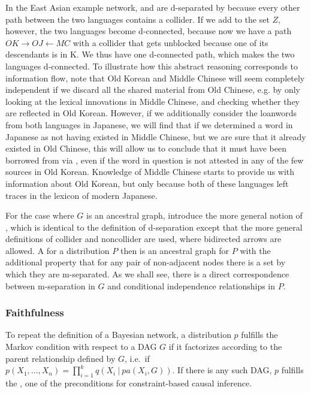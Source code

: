 In the East Asian example network,  and  are d-separated by  because every other path between the two languages contains a collider. If we add  to the set $Z$, however, the two languages become d-connected, because now we have a path $OK \rightarrow OJ \leftarrow MC$ with a collider that gets unblocked because one of its descendants is in K. We thus have one d-connected path, which makes the two languages d-connected. To illustrate how this abstract reasoning corresponds to information flow, note that Old Korean and Middle Chinese will seem completely independent if we discard all the shared material from Old Chinese, e.g. by only looking at the lexical innovations in Middle Chinese, and checking whether they are reflected in Old Korean. However, if we additionally consider the loanwords from both languages in Japanese, we will find that if we determined a word in Japanese as not having existed in Middle Chinese, but we are sure that it 
already existed in Old Chinese, this will allow us to conclude that it must have been borrowed from  via , even if the word in question is not attested in any of the few sources in Old Korean. Knowledge of Middle Chinese starts to provide us with information about Old Korean, but only because both of these languages left traces in the lexicon of modern Japanese.

For the case where $G$ is an ancestral graph, \cite{richardson_spirtes_2002} introduce the more general notion of \textit{}, which is identical to the definition of d-separation except that the more general definitions of collider and noncollider are used, where bidirected arrows are allowed. A  for a distribution $P$ then is an ancestral graph for $P$ with the additional property that for any pair of non-adjacent nodes there is a set by which they are m-separated. As we shall see, there is a direct correspondence between m-separation in $G$ and conditional independence relationships in $P$.

\subsubsection{Faithfulness}
To repeat the definition of a Bayesian network, a distribution $p$ fulfills the Markov condition with respect to a DAG $G$ if it factorizes according to the parent relationship defined by $G$, i.e.\ if $p(X_1,\dots,X_n) = \prod_{i=1}^k q(X_i\ |\ pa(X_i,G))$. If there is any such DAG, $p$ fulfills the \textit{}, one of the preconditions for constraint-based causal inference.

